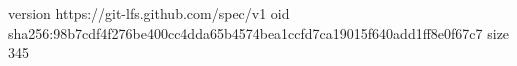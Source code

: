 version https://git-lfs.github.com/spec/v1
oid sha256:98b7cdf4f276be400cc4dda65b4574bea1ccfd7ca19015f640add1ff8e0f67c7
size 345
